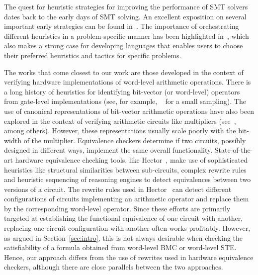 The quest for heuristic strategies for improving the performance of
SMT solvers dates back to the early days of SMT solving.  An excellent
exposition on several important early strategies can be found
in~\cite{barrett}.  The importance of orchestrating different
heuristics in a problem-specific manner has been highlighted
in~\cite{deMoura2013}, which also makes a strong case for developing
languages that enables users to choose their preferred heuristics and
tactics for specific problems.

The works that come closest to our work are those developed in the
context of verifying hardware implementations of word-level arithmetic
operations.  There is a long history of heuristics for identifying
bit-vector (or word-level) operators from gate-level implementations
(see, for example,
~\cite{kunz,ciesielski,reveng,earlier-pat-match-synopsys} for a small
sampling).  The use of canonical representations of bit-vector
arithmetic operations have also been explored in the context of
verifying arithmetic circuits like multipliers
(see~\cite{bmd,drechsler}, among others).  However, these
representations usually scale poorly with the bit-width of the
multiplier.  Equivalence checkers determine if two circuits, possibly
designed in different ways, implement the same overall functionality.
State-of-the-art hardware equivalence checking tools, like
Hector~\cite{hector}, make use of sophisticated heuristics like
structural similarities between sub-circuits, complex rewrite rules
and heuristic sequencing of reasoning engines to detect equivalences
between two versions of a circuit.  The rewrite rules used in
Hector~\cite{kolbl} can detect different configurations of circuits
implementing an arithmetic operator and replace them by the
corresponding word-level operator.  Since these efforts are primarily
targeted at establishing the functional equivalence of one circuit
with another, replacing one circuit configuration with another often
works profitably.  However, as argued in Section~\ref{sec:intro}, this
is not always desirable when checking the satisfiability of a formula
obtained from word-level BMC or word-level STE.  Hence, our approach
differs from the use of rewrites used in hardware equivalence
checkers, although there are close parallels between the two
approaches.


